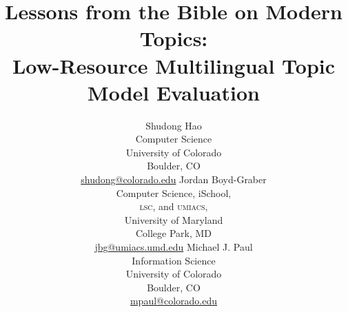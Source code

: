\documentclass[11pt,a4paper]{article}
\title{Lessons from the Bible on Modern Topics: \\ Low-Resource Multilingual Topic
  Model Evaluation}
\author{Shudong Hao \\
		Computer Science \\
		University of Colorado\\
		Boulder, CO \\
		{\small \url{shudong@colorado.edu}}
        \And
        Jordan Boyd-Graber \\   
        Computer Science, iSchool, \\ \textsc{lsc}, and \textsc{umiacs},\\
        University of Maryland \\
        College Park, MD \\
        {\small \url{jbg@umiacs.umd.edu}}
        \And
        Michael J. Paul \\
		Information Science \\
		University of Colorado\\
		Boulder, CO \\
		{\small \url{mpaul@colorado.edu}}
}
\date{}
\theoremstyle{theoremdd}
\begin{document}
\maketitle
\begin{abstract}

\end{abstract}















\end{document}
